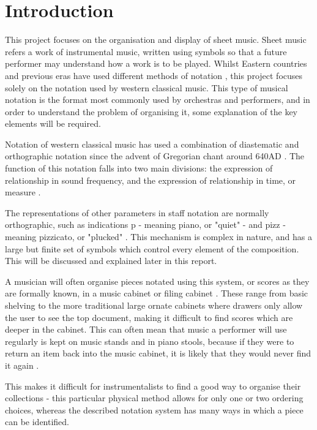 \section{Introduction}
This project focuses on the organisation and display of sheet music. Sheet music refers a work of instrumental music, written using symbols so that a future performer may understand how a work is to be played. Whilst Eastern countries and previous eras have used different methods of notation \parencite{Kaufman}, this project focuses solely on the notation used by western classical music. This type of musical notation is the format most commonly used by orchestras and performers, and in order to understand the problem of organising it, some explanation of the key elements will be required.

Notation of western classical music has used a combination of diastematic and orthographic notation \parencite{RRastall} since the advent of Gregorian chant around 640AD \parencite{RTaruskin}. The function of this notation falls into two main divisions: the expression of relationship in sound frequency, and the expression of relationship in time, or measure \parencite{oxHistory}.

The representations of other parameters in staff notation are normally orthographic, such as indications p - meaning piano, or "quiet" - and pizz - meaning pizzicato, or "plucked" \parencite{RRastall}. This mechanism is complex in nature, and has a large but finite set of symbols which control every element of the composition. This will be discussed and explained later in this report.

A musician will often organise pieces notated using this system, or scores as they are formally known, in a music cabinet or filing cabinet \parencite{musicOrganising}. These range from basic shelving to the more traditional large ornate cabinets where drawers only allow the user to see the top document, making it difficult to find scores which are deeper in the cabinet. This can often mean that music a performer will use regularly is kept on music stands and in piano stools, because if they were to return an item back into the music cabinet, it is likely that they would never find it again \parencite{SheetMusicRant}.

This makes it difficult for instrumentalists to find a good way to organise their collections - this particular physical method allows for only one or two ordering choices, whereas the described notation system has many ways in which a piece can be identified. 

